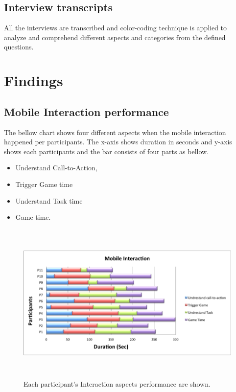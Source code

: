 \subsection{Interview transcripts}
All the interviews are transcribed and color-coding technique is applied to analyze and comprehend different aspects and categories from the defined questions.



\section{Findings}

\subsection{Mobile Interaction performance}
The bellow chart shows four different aspects when the mobile interaction happened per participants. The x-axis shows duration in seconds and y-axis shows each participants and the bar consists of four parts as bellow.
\begin{itemize}
\item	Understand Call-to-Action,
\item	Trigger Game time
\item	Understand Task time
\item Game time.
\end{itemize}

\begin{figure}[H]
\centering
\includegraphics[width=12cm,height=8cm]{Figures/6/mobile_performance}%
 \caption{Each participant's Interaction aspects performance are shown. }%
 \label{fig:mobile_performance}%
\end{figure}


